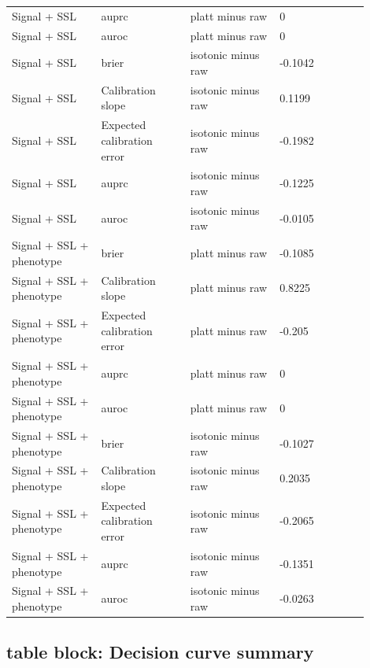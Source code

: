 \documentclass[11pt]{article}
\begin{document}
\begin{landscape}
\begin{longtable}{L{0.225\linewidth} L{0.225\linewidth} L{0.225\linewidth} L{0.225\linewidth}}
Signal + SSL & auprc & platt minus raw & 0 \\
Signal + SSL & auroc & platt minus raw & 0 \\
Signal + SSL & brier & isotonic minus raw & -\allowbreak{}0.\allowbreak{}1042 \\
Signal + SSL & Calibration slope & isotonic minus raw & 0.\allowbreak{}1199 \\
Signal + SSL & Expected calibration error & isotonic minus raw & -\allowbreak{}0.\allowbreak{}1982 \\
Signal + SSL & auprc & isotonic minus raw & -\allowbreak{}0.\allowbreak{}1225 \\
Signal + SSL & auroc & isotonic minus raw & -\allowbreak{}0.\allowbreak{}0105 \\
Signal + SSL + phenotype & brier & platt minus raw & -\allowbreak{}0.\allowbreak{}1085 \\
Signal + SSL + phenotype & Calibration slope & platt minus raw & 0.\allowbreak{}8225 \\
Signal + SSL + phenotype & Expected calibration error & platt minus raw & -\allowbreak{}0.\allowbreak{}205 \\
Signal + SSL + phenotype & auprc & platt minus raw & 0 \\
Signal + SSL + phenotype & auroc & platt minus raw & 0 \\
Signal + SSL + phenotype & brier & isotonic minus raw & -\allowbreak{}0.\allowbreak{}1027 \\
Signal + SSL + phenotype & Calibration slope & isotonic minus raw & 0.\allowbreak{}2035 \\
Signal + SSL + phenotype & Expected calibration error & isotonic minus raw & -\allowbreak{}0.\allowbreak{}2065 \\
Signal + SSL + phenotype & auprc & isotonic minus raw & -\allowbreak{}0.\allowbreak{}1351 \\
Signal + SSL + phenotype & auroc & isotonic minus raw & -\allowbreak{}0.\allowbreak{}0263 \\
\end{longtable}
\normalsize
\end{landscape}


\subsection*{table block: Decision curve summary}
\end{document}

